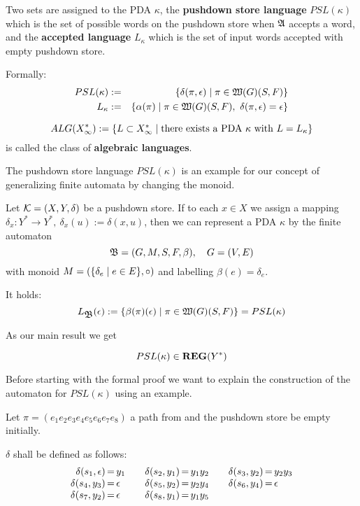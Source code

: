 
Two sets are assigned to the PDA $\kappa$, the {\bf pushdown store language}
$PSL(\kappa)$ which is the set of possible words on the pushdown store when
$\mbox{$\mathfrak{A}$}$ accepts a word, and the {\bf accepted language} $L_\kappa$ which is the set of
 input words accepted with empty pushdown store.

Formally:
\begin{eqnarray*}
PSL(\kappa) &:=& \mbox{$\{\delta(\pi, \epsilon) \mid \pi \in \mbox{$\mathfrak{W}(G)$}(S, F)\}$}\\
L_\kappa &:=& \mbox{$\{\alpha(\pi) \mid \pi \in \mbox{$\mathfrak{W}(G)$}(S, F),\ \delta(\pi,
\epsilon) = \epsilon\}$}
\end{eqnarray*}

\begin{definition}
\[ ALG(X_\infty^*) := \mbox{$\{L \subset X_\infty^* \mid \text{there exists a PDA
$\kappa$ with $L = L_\kappa$}\}$}
\]
is called the class of {\bf algebraic languages}.
\end{definition}

The pushdown store language $PSL(\kappa)$ is an example for our concept of
generalizing finite automata by changing the monoid. 

Let $\mbox{$\mathcal{K}$}=(X, Y, \delta)$ be a pushdown store. If to each $x\in X$ we
assign a mapping $\delta_x: Y^* \to Y^*,\ \delta_x(u) := \delta(x, u)$, then we can 
represent a PDA $\kappa$ by the finite automaton
\[ \mbox{$\mathfrak{B}$} = (G, M, S, F, \beta),\quad G=(V,E) \]
with monoid $M = (\mbox{$\{\delta_e \mid e\in E\}$}, \circ)$ and labelling $\beta(e)
= \delta_e$.

It holds:
\[ L_{\mbox{$\mathfrak{B}$}}(\epsilon) := \mbox{$\{\beta(\pi)(\epsilon) \mid \pi
\in \mbox{$\mathfrak{W}(G)$}(S, F)\}$} = PSL(\kappa)
\]

\bigskip
As our main result we get
\begin{theorem}
\[ PSL(\kappa) \in \mbox{{\bf REG}}(Y^*) \]
\end{theorem}

Before starting with the formal proof we want to explain the construction of the
automaton for $PSL(\kappa)$ using an example.

Let $\pi = (e_1 e_2 e_3 e_4 e_5 e_6 e_7 e_8)$ a path from  and the
pushdown store be empty initially.

$\delta$ shall be defined as follows:
\[\begin{array}{r@{\,=\,}l@{\qquad}r@{\,=\,}l@{\qquad}r@{\,=\,}l}
\delta(s_1,\epsilon)&y_1 & \delta(s_2,y_1)&y_1y_2 & \delta(s_3,y_2)&y_2y_3 \\
\delta(s_4,y_3)&\epsilon & \delta(s_5,y_2)&y_2y_4 & \delta(s_6,y_4)&\epsilon \\
\delta(s_7,y_2)&\epsilon & \delta(s_8,y_1)&y_1y_5
\end{array}\]

